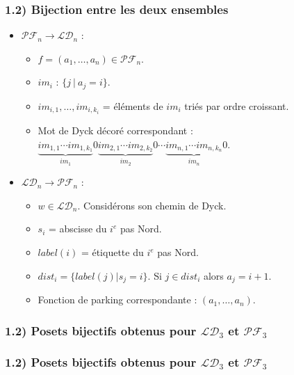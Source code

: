 \documentclass{beamer}
\begin{document}
\begin{frame} %
    \frametitle{1.2) \textbf{Bijection} entre les deux ensembles}
    \begin{itemize}
        \item $\mathcal{PF}_n \to \mathcal{LD}_n$ :
        \begin{itemize}
            \item $f = (a_1, \ldots, a_n) \in \mathcal{PF}_n$.
            \item $im_i$ : $\{j\ |\ a_j = i\}$.
            \item $im_{i,1}, \ldots, im_{i,k_i}$ = éléments de $im_i$
                triés par ordre croissant.
            \item Mot de Dyck décoré correspondant : $\underbrace{im_{1,1}
                \cdots im_{1,k_1}}_{im_1}0\underbrace{im_{2,1} \cdots
                im_{2,k_2}}_{im_2}0 \cdots \underbrace{im_{n,1} \cdots 
                im_{n,k_n}}_{im_n}0$.
        \end{itemize}
        \item $\mathcal{LD}_n \to \mathcal{PF}_n$ :
        \begin{itemize}
            \item $w \in \mathcal{LD}_n$. Considérons son chemin de Dyck.
            \item $s_i$ = abscisse du $i^{e}$ pas Nord.
            \item $label(i)$ = étiquette du $i^{e}$ pas Nord.
            \item $dist_i = \{label(j) | s_j = i\}$.
                Si $j \in dist_i$ alors $a_j = i + 1$.
            \item Fonction de parking correspondante : $(a_1, \ldots, a_n)$.
        \end{itemize}
    \end{itemize}
\end{frame}

\begin{frame} %
    \frametitle{1.2) Posets \textbf{bijectifs} obtenus pour $\mathcal{LD}_3$
        et $\mathcal{PF}_3$}
    \begin{center}
        
    \end{center}
\end{frame}

\begin{frame} %
    \frametitle{1.2) Posets \textbf{bijectifs} obtenus pour $\mathcal{LD}_3$
        et $\mathcal{PF}_3$}
    \begin{center}
        
    \end{center}
\end{frame}
\end{document}
